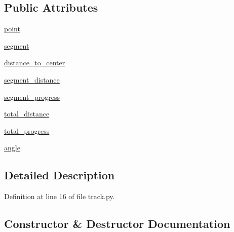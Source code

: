 \subsection*{Public Attributes}
\begin{DoxyCompactItemize}
\item 
\hyperlink{classsimulation__tools_1_1track_1_1_track_position_a5c5ad2aecf6e00e6611e8ad70b38de7b}{point}
\item 
\hyperlink{classsimulation__tools_1_1track_1_1_track_position_ab5feb6f2789576c88fe7310f28e4c4db}{segment}
\item 
\hyperlink{classsimulation__tools_1_1track_1_1_track_position_a1d45644ad2113e0c7a8e546f52015d46}{distance\+\_\+to\+\_\+center}
\item 
\hyperlink{classsimulation__tools_1_1track_1_1_track_position_a89c184a72d3b1636bf9531de144374e4}{segment\+\_\+distance}
\item 
\hyperlink{classsimulation__tools_1_1track_1_1_track_position_a1ce2f49333cc2e6d5ac1094a3e919eeb}{segment\+\_\+progress}
\item 
\hyperlink{classsimulation__tools_1_1track_1_1_track_position_a488a7374a672827079686cf7fece12ee}{total\+\_\+distance}
\item 
\hyperlink{classsimulation__tools_1_1track_1_1_track_position_a0471b3519ccab2dfd048ed02853f8a8d}{total\+\_\+progress}
\item 
\hyperlink{classsimulation__tools_1_1track_1_1_track_position_a4809c7245ab044b2b3ca96fbdc80fe72}{angle}
\end{DoxyCompactItemize}


\subsection{Detailed Description}


Definition at line 16 of file track.\+py.



\subsection{Constructor \& Destructor Documentation}
